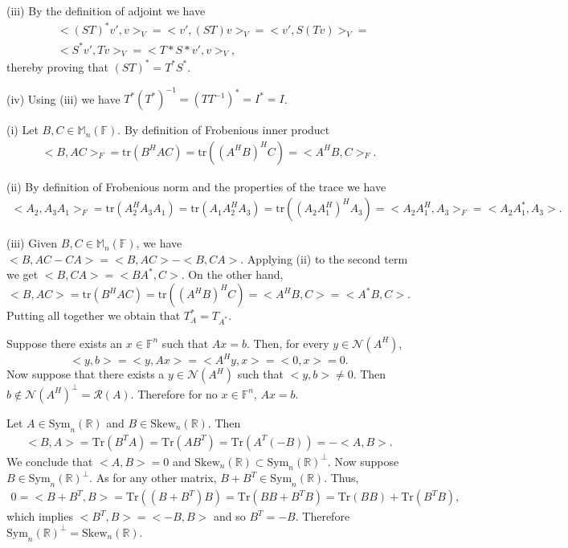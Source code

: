 \documentclass[letterpaper,12pt]{article}
\theoremstyle{definition}
\newenvironment{problem}[2][Problem]{\begin{trivlist}
\item[\hskip \labelsep {\bfseries #1}\hskip \labelsep {\bfseries #2.}]}{\end{trivlist}}
\begin{document}
\begin{problem}{39}
(iii)
By the definition of adjoint we have
\begin{align*}
    &<(ST)^*v',v>_V=<v',(ST)v>_V=<v',S(Tv)>_V=\\
    &<S^*v',Tv>_V=<T*S*v',v>_V,
\end{align*}
thereby proving that $(ST)^*=T^*S^*$.

(iv)
Using (iii) we have $T^*(T^*)^{-1}=(TT^{-1})^*=I^*=I$.

\end{problem} \begin{problem}{40}
(i)
Let $B,C\in\mathbb M_n(\mathbb F)$.
By definition of Frobenious inner product
\begin{align*}
    <B,AC>_F=\text{tr}(B^HAC)=\text{tr}((A^HB)^HC)=<A^HB,C>_F.
\end{align*}

(ii)
By definition of Frobenious norm and the properties of the trace we have
\begin{align*}
    <A_2,A_3A_1>_F=\text{tr}(A_2^HA_3A_1)=
    \text{tr}(A_1A_2^HA_3)=\text{tr}((A_2A_1^H)^HA_3)=
    <A_2A_1^H,A_3>_F=<A_2A_1^*,A_3>.
\end{align*}

(iii)
Given $B,C\in\mathbb M_n(\mathbb F)$, we have $<B,AC-CA>=<B,AC>-<B,CA>$.
Applying (ii) to the second term we get $<B,CA>=<BA^*,C>$.
On the other hand,
\begin{equation*}
    <B,AC>=\text{tr}(B^HAC)=\text{tr}((A^HB)^HC)=<A^HB,C>=<A^*B,C>.
\end{equation*}
Putting all together we obtain that $T_A^*=T_{A^*}$.

\end{problem} \begin{problem}{44}
Suppose there exists an $x\in\mathbb F^n$ such that $Ax=b$.
Then, for every $y\in\mathcal N(A^H)$,
$$<y,b>=<y,Ax>=<A^Hy,x>=<0,x>=0.$$
Now suppose that there exists a $y\in\mathcal N(A^H)$ such that $<y,b>\neq0$.
Then $b\notin\mathcal N(A^H)^\perp=\mathcal R(A)$.
Therefore for no $x\in\mathbb F^n$, $Ax=b$.

\end{problem} \begin{problem}{45}
Let $A\in\text{Sym}_n(\mathbb R)$ and $B\in\text{Skew}_n(\mathbb R)$.
Then
\begin{align*}
    <B,A>=\text{Tr}(B^TA)=\text{Tr}(AB^T)=
    \text{Tr}(A^T(-B))=-<A,B>.
\end{align*}
We conclude that $<A,B>=0$ and $\text{Skew}_n(\mathbb R)\subset\text{Sym}_n(\mathbb R)^\perp$.
Now suppose $B\in\text{Sym}_n(\mathbb R)^\perp$.
As for any other matrix, $B+B^T\in\text{Sym}_n(\mathbb R)$.
Thus,
\begin{align*}
    0 = <B+B^T,B>=\text{Tr}((B+B^T)B) =\text{Tr}(BB + B^TB)=
    \text{Tr}(BB)+\text{Tr}(B^TB),
\end{align*}
which implies $<B^T,B>=<-B,B>$ and so $B^T=-B$.
Therefore $\text{Sym}_n(\mathbb R)^\perp=\text{Skew}_n(\mathbb R)$.


\end{problem}
\end{document}
